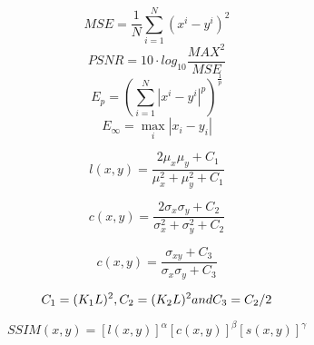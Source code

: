 \begin{equation}
MSE= \frac{1}{N} \sum_{i=1}^N{(x^i-y^i)^2}
\end{equation}
\begin{equation}
PSNR= 10 \cdot log_{10}\frac{MAX^2}{MSE}
\end{equation}
\begin{equation}
E_p = ( \sum_{i=1}^N{|x^i-y^i|^p})^{\frac{1}{p}}
\end{equation}
\begin{equation}
E_\infty = \max_i{|x_i-y_i|}
\end{equation}

\begin{equation}
l(x, y) = \frac{2\mu_x \mu_y + C_1}{\mu_x^2 + \mu_y^2 + C_1}
\end{equation}

\begin{equation}
c(x, y) = \frac{2\sigma_x \sigma_y + C_2}{\sigma_x^2 + \sigma_y^2 + C_2}
\end{equation}

\begin{equation}
c(x, y) = \frac{\sigma_{xy} + C_3}{\sigma_x \sigma_y + C_3}
\end{equation}

\begin{equation}
C_1 = (K_1 L)^2, C_2 = (K_2 L)^2 \space and \space C_3 = C_2/2
\end{equation}

\begin{equation}
SSIM(x, y) = [l(x, y)]^\alpha [c(x, y)]^\beta [s(x, y)]^\gamma
\end{equation} 